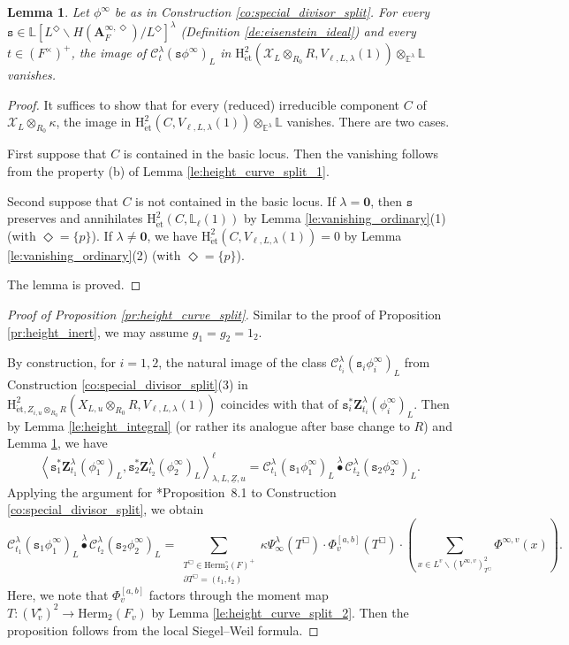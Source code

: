 \documentclass[12pt]{amsart}
\numberwithin{equation}{section}
\theoremstyle{plain}
\newtheorem{lem}[proposition]{Lemma}
\theoremstyle{definition}
\theoremstyle{remark}
\renewcommand{\b}[1]{\mathbf{#1}}
\renewcommand{\c}[1]{\mathcal{#1}}
\renewcommand{\d}[1]{\mathbb{#1}}
\renewcommand{\r}[1]{\mathrm{#1}}
\renewcommand{\(}{\left(}
\renewcommand{\)}{\right)}
\newcommand{\ul}{\underline}
\newcommand{\bA}{\b A}
\newcommand{\cC}{\c C}
\newcommand{\cX}{\c X}
\newcommand{\dE}{\d E}
\newcommand{\dL}{\d L}
\newcommand{\rH}{\r H}
\newcommand{\ts}{\mathtt{s}}
\newcommand{\bbZ}{\boldsymbol{Z}}
\newcommand{\llangle}{\left\langle}
\newcommand{\rrangle}{\right\rangle}
\newcommand{\et}{{\acute{\r{e}}\r{t}}}
\newcommand{\Herm}{\r{Herm}}
\begin{document}
\begin{lem}\label{le:height_curve_split_3}
Let $\phi^\infty$ be as in Construction \ref{co:special_divisor_split}. For every $\ts\in\dL[L^\Diamond\backslash H(\bA_F^{\infty,\Diamond})/L^\Diamond]^\lambda$ (Definition \ref{de:eisenstein_ideal}) and every $t\in (F^\times)^+$, the image of $\cC^\lambda_t(\ts\phi^\infty)_L$ in $\rH^2_{\et}(\cX_L\otimes_{R_0}R,V_{\ell,L,\lambda}(1))\otimes_{\dE^\lambda}\dL$ vanishes.
\end{lem}

\begin{proof}
It suffices to show that for every (reduced) irreducible component $C$ of $\cX_L\otimes_{R_0}\kappa$, the image in $\rH^2_{\et}(C,V_{\ell,L,\lambda}(1))\otimes_{\dE^\lambda}\dL$ vanishes. There are two cases.

First suppose that $C$ is contained in the basic locus. Then the vanishing follows from the property (b) of Lemma \ref{le:height_curve_split_1}.

Second suppose that $C$ is not contained in the basic locus. If $\lambda=\b{0}$, then $\ts$ preserves and annihilates $\rH^2_{\et}(C,\dL_\ell(1))$ by Lemma \ref{le:vanishing_ordinary}(1) (with $\Diamond=\{p\}$). If $\lambda\neq\b{0}$, we have $\rH^2_{\et}(C,V_{\ell,L,\lambda}(1))=0$ by Lemma \ref{le:vanishing_ordinary}(2) (with $\Diamond=\{p\}$).

The lemma is proved.
\end{proof}







\begin{proof}[Proof of Proposition \ref{pr:height_curve_split}]
Similar to the proof of Proposition \ref{pr:height_inert}, we may assume $g_1=g_2=1_2$.

By construction, for $i=1,2$, the natural image of the class $\cC^\lambda_{t_i}(\ts_i\phi^\infty_i)_L$ from Construction \ref{co:special_divisor_split}(3) in $\rH^2_{\et,Z_{i,u}\otimes_{R_0}R}(X_{L,u}\otimes_{R_0}R,V_{\ell,L,\lambda}(1))$ coincides with that of $\ts_i^*\bbZ^\lambda_{t_i}(\phi^\infty_i)_L$. Then by Lemma \ref{le:height_integral} (or rather its analogue after base change to $R$) and Lemma \ref{le:height_curve_split_3}, we have
\[
\llangle\ts_1^*\bbZ^\lambda_{t_1}(\phi^\infty_1)_L,\ts_2^*\bbZ^\lambda_{t_2}(\phi^\infty_2)_L\rrangle_{\lambda,L,\ul{Z},u}^\ell
=\cC^\lambda_{t_1}(\ts_1\phi^\infty_1)_L\overset{\lambda}\bullet\cC^\lambda_{t_2}(\ts_2\phi^\infty_2)_L.
\]
Applying the argument for \cite{LL21}*{Proposition~8.1} to Construction \ref{co:special_divisor_split}, we obtain
\[
\cC^\lambda_{t_1}(\ts_1\phi^\infty_1)_L\overset{\lambda}\bullet\cC^\lambda_{t_2}(\ts_2\phi^\infty_2)_L
=\sum_{\substack{T^\Box\in\Herm_2^\circ(F)^+\\ \partial T^\Box=(t_1,t_2)}}
\kappa\Psi^\lambda_\infty(T^\Box)\cdot\Phi^{[a,b]}_v(T^\Box)\cdot\(\sum_{x\in L^v\backslash (V^{\infty,v})^2_{T^\Box}}
\Phi^{\infty,v}(x)\).
\]
Here, we note that $\Phi^{[a,b]}_v$ factors through the moment map $T\colon(V^\star_v)^2\to\Herm_2(F_v)$ by Lemma \ref{le:height_curve_split_2}. Then the proposition follows from the local Siegel--Weil formula.
\end{proof}
\end{document}
